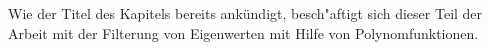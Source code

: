 Wie der Titel des Kapitels bereits ankündigt, besch"aftigt sich dieser Teil
der Arbeit mit der Filterung von Eigenwerten mit Hilfe von Polynomfunktionen.
